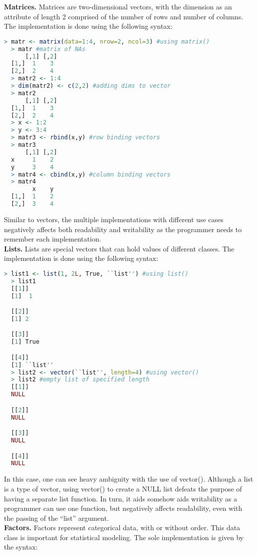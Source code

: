 \documentclass[12pt]{article}
\begin{document}
\textbf{Matrices.} Matrices are two-dimensional vectors, with the dimension as an attribute of length 2 comprised of the number of rows and number of columns. The implementation is done using the following syntax:

\begin{lstlisting}[language=R, frame=none]
  > matr <- matrix(data=1:4, nrow=2, ncol=3) #using matrix()
  > matr #matrix of NAs
      [,1] [,2]
  [1,]  1    3
  [2,]  2    4
  > matr2 <- 1:4
  > dim(matr2) <- c(2,2) #adding dims to vector
  > matr2
      [,1] [,2]
  [1,]  1    3
  [2,]  2    4
  > x <- 1:2
  > y <- 3:4
  > matr3 <- rbind(x,y) #row binding vectors
  > matr3
      [,1] [,2]
  x     1    2
  y     3    4
  > matr4 <- cbind(x,y) #column binding vectors
  > matr4
        x    y
  [1,]  1    2
  [2,]  3    4
\end{lstlisting}

Similar to vectors, the multiple implementations with different use cases negatively affects both readability and writability as the programmer needs to remember each implementation.\\

\textbf{Lists.} Lists are special vectors that can hold values of different classes. The implementation is done using the following syntax:

\begin{lstlisting}[language=R, frame=none]
  > list1 <- list(1, 2L, True, ``list'') #using list()
  > list1
  [[1]]
  [1]  1

  [[2]]
  [1] 2

  [[3]]
  [1] True

  [[4]]
  [1] ``list''
  > list2 <- vector(``list'', length=4) #using vector()
  > list2 #empty list of specified length
  [[1]]
  NULL

  [[2]]
  NULL

  [[3]]
  NULL

  [[4]]
  NULL
\end{lstlisting}

In this case, one can see heavy ambiguity with the use of vector(). Although a list is a type of vector, using vector() to create a NULL list defeats the purpose of having a separate list function. In turn, it aids somehow aids writability as a programmer can use one function, but negatively affects readability, even with the passing of the ``list'' argument.\\

\textbf{Factors.} Factors represent categorical data, with or without order. This data class is important for statistical modeling. The sole implementation is given by the syntax:
\end{document}
